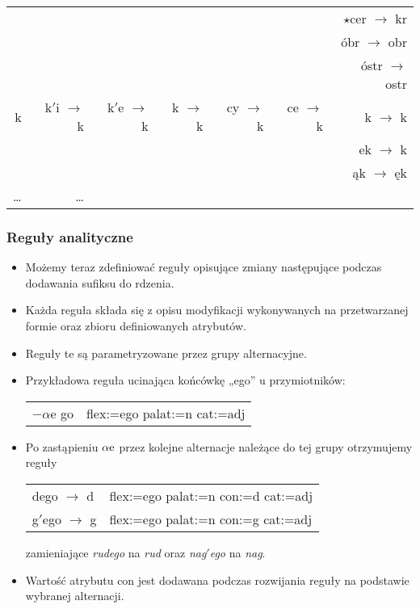 \documentclass{beamer}
\begin{document}
\begin{frame}
\begin{scriptsize}
\begin{longtable}{r|rrrrrr}
 &  &  &  &  &  & $\star$cer $\rightarrow$ kr\\
 &  &  &  &  &  & óbr $\rightarrow$ obr\\
 &  &  &  &  &  & óstr $\rightarrow$ ostr\\
\hline
k & k$'$i $\rightarrow$ k & k$'$e $\rightarrow$ k & k $\rightarrow$ k & cy $\rightarrow$ k & ce $\rightarrow$ k & k $\rightarrow$ k\\
 &  &  &  &  &  & ek $\rightarrow$ k\\
 &  &  &  &  &  & ąk $\rightarrow$ ęk\\
\hline
\dots & \dots
\end{longtable}\end{scriptsize}
\end{frame}

\begin{frame}
\frametitle{Reguły analityczne}
\begin{itemize}
\item Możemy teraz zdefiniować reguły opisujące zmiany następujące podczas dodawania sufiksu do rdzenia.
\item Każda reguła składa się z opisu modyfikacji wykonywanych na przetwarzanej formie oraz zbioru definiowanych atrybutów.
\item Reguły te są parametryzowane przez grupy alternacyjne.
\item Przykładowa reguła ucinająca końcówkę „ego” u przymiotników:
\begin{center}
\begin{tabular}{ll}
$-$\boldmath$\alpha${\rm e} go & flex:=ego palat:=n cat:=adj\\
\end{tabular}
\end{center}
\item Po zastąpieniu $\boldmath\alpha{\rm e}$ przez kolejne alternacje należące do tej grupy otrzymujemy reguły
\begin{center}
\begin{tabular}{ll}
dego $\rightarrow$ d & flex:=ego palat:=n con:=d cat:=adj\\
g$'$ego $\rightarrow$ g & flex:=ego palat:=n con:=g cat:=adj
\end{tabular}
\end{center}
zamieniające {\it rudego} na {\it rud} oraz {\it nag$'$ego} na {\it nag}.
\item Wartość atrybutu con jest dodawana podczas rozwijania reguły na podstawie wybranej alternacji.
\end{itemize}
\end{frame}
\end{document}
